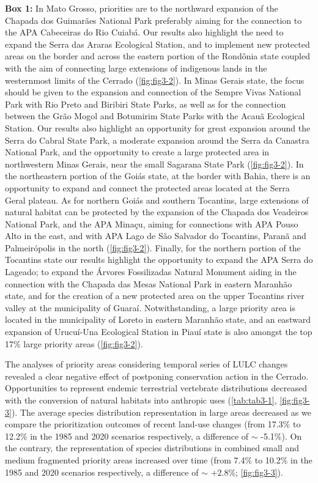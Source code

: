 \documentclass[12pt,openright,oneside,a4paper,english]{abntex2}
\begin{document}
\begin{mdframed}[backgroundcolor=lightgray, linecolor=lightgray]
	\small \textbf{Box 1:} In Mato Grosso, priorities are to the northward expansion of the Chapada dos Guimarães National Park preferably aiming for the connection to the APA Cabeceiras do Rio Cuiabá. Our results also highlight the need to expand the Serra das Araras Ecological Station, and to implement new protected areas on the border and across the eastern portion of the Rondônia state coupled with the aim of connecting large extensions of indigenous lands in the westernmost limits of the Cerrado (\autoref{fig:fig3-2}). In Minas Gerais state, the focus should be given to the expansion and connection of the Sempre Vivas National Park with Rio Preto and Biribiri State Parks, as well as for the connection between the Grão Mogol and Botumirim State Parks with the Acauã Ecological Station. Our results also highlight an opportunity for great expansion around the Serra do Cabral State Park, a moderate expansion around the Serra da Canastra National Park, and the opportunity to create a large protected area in northwestern Minas Gerais, near the small Sagarana State Park (\autoref{fig:fig3-2}). In the northeastern portion of the Goiás state, at the border with Bahia, there is an opportunity to expand and connect the protected areas located at the Serra Geral plateau. As for northern Goiás and southern Tocantins, large extensions of natural habitat can be protected by the expansion of the Chapada dos Veadeiros National Park, and the APA Minaçu, aiming for connections with APA Pouso Alto in the east, and with APA Lago de São Salvador do Tocantins, Paranã and Palmeirópolis in the north (\autoref{fig:fig3-2}). Finally, for the northern portion of the Tocantins state our results highlight the opportunity to expand the APA Serra do Lageado; to expand the Árvores Fossilizadas Natural Monument aiding in the connection with the Chapada das Mesas National Park in eastern Maranhão state, and for the creation of a new protected area on the upper Tocantins river valley at the municipality of Guaraí. Notwithstanding, a large priority area is located in the municipality of Loreto in eastern Maranhão state, and an eastward expansion of Urucuí-Una Ecological Station in Piauí state is also amongst the top 17\% large priority areas (\autoref{fig:fig3-2}).
\end{mdframed}

The analyses of priority areas considering temporal series of LULC changes revealed a clear negative effect of postponing conservation action in the Cerrado. Opportunities to represent endemic terrestrial vertebrate distributions decreased with the conversion of natural habitats into anthropic uses (\autoref{tab:tab3-1}, \autoref{fig:fig3-3}). The average species distribution representation in large areas decreased as we compare the prioritization outcomes of recent land-use changes (from 17.3\% to 12.2\% in the 1985 and 2020 scenarios respectively, a difference of $\sim$ -5.1\%). On the contrary, the representation of species distributions in combined small and medium fragmented priority areas increased over time (from 7.4\% to 10.2\% in the 1985 and 2020 scenarios respectively, a difference of $\sim$ +2.8\%; \autoref{fig:fig3-3}).
\end{document}
